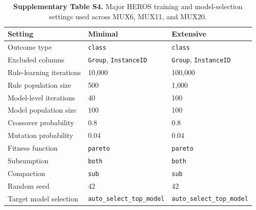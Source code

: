 \documentclass[11pt]{article}
\begin{document}
\begin{table}[H]
\caption*{\textbf{Supplementary Table S4.} Major HEROS training and model-selection settings used across MUX6, MUX11, and MUX20.}
\label{tab:heros-settings-supp}
\centering
\small
\setlength{\tabcolsep}{3pt}
\renewcommand{\arraystretch}{1.05}
\begin{tabular}{L{0.37\columnwidth}L{0.22\columnwidth}L{0.24\columnwidth}}
\toprule
\textbf{Setting} & \textbf{Minimal} & \textbf{Extensive} \\
\midrule
Outcome type & \texttt{class} & \texttt{class} \\
Excluded columns & \texttt{Group}, \texttt{InstanceID} & \texttt{Group}, \texttt{InstanceID} \\
Rule-learning iterations & 10{,}000 & 100{,}000 \\
Rule population size & 500 & 1{,}000 \\
Model-level iterations & 40 & 100 \\
Model population size & 100 & 100 \\
Crossover probability & 0.8 & 0.8 \\
Mutation probability & 0.04 & 0.04 \\
Fitness function & \texttt{pareto} & \texttt{pareto} \\
Subsumption & \texttt{both} & \texttt{both} \\
Compaction & \texttt{sub} & \texttt{sub} \\
Random seed & 42 & 42 \\
Target model selection & \texttt{auto\_select\_top\_model} & \texttt{auto\_select\_top\_model} \\
\bottomrule
\end{tabular}
\end{table}
\end{document}

